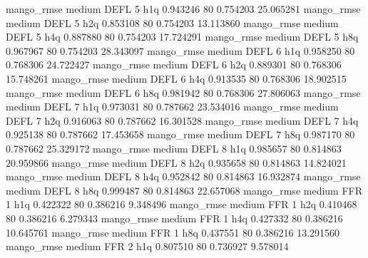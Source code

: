        mango_rmse     medium     DEFL                 5                  h1q  0.943246 80       0.754203          25.065281
       mango_rmse     medium     DEFL                 5                  h2q  0.853108 80       0.754203          13.113860
       mango_rmse     medium     DEFL                 5                  h4q  0.887880 80       0.754203          17.724291
       mango_rmse     medium     DEFL                 5                  h8q  0.967967 80       0.754203          28.343097
       mango_rmse     medium     DEFL                 6                  h1q  0.958250 80       0.768306          24.722427
       mango_rmse     medium     DEFL                 6                  h2q  0.889301 80       0.768306          15.748261
       mango_rmse     medium     DEFL                 6                  h4q  0.913535 80       0.768306          18.902515
       mango_rmse     medium     DEFL                 6                  h8q  0.981942 80       0.768306          27.806063
       mango_rmse     medium     DEFL                 7                  h1q  0.973031 80       0.787662          23.534016
       mango_rmse     medium     DEFL                 7                  h2q  0.916063 80       0.787662          16.301528
       mango_rmse     medium     DEFL                 7                  h4q  0.925138 80       0.787662          17.453658
       mango_rmse     medium     DEFL                 7                  h8q  0.987170 80       0.787662          25.329172
       mango_rmse     medium     DEFL                 8                  h1q  0.985657 80       0.814863          20.959866
       mango_rmse     medium     DEFL                 8                  h2q  0.935658 80       0.814863          14.824021
       mango_rmse     medium     DEFL                 8                  h4q  0.952842 80       0.814863          16.932874
       mango_rmse     medium     DEFL                 8                  h8q  0.999487 80       0.814863          22.657068
       mango_rmse     medium      FFR                 1                  h1q  0.422322 80       0.386216           9.348496
       mango_rmse     medium      FFR                 1                  h2q  0.410468 80       0.386216           6.279343
       mango_rmse     medium      FFR                 1                  h4q  0.427332 80       0.386216          10.645761
       mango_rmse     medium      FFR                 1                  h8q  0.437551 80       0.386216          13.291560
       mango_rmse     medium      FFR                 2                  h1q  0.807510 80       0.736927           9.578014
